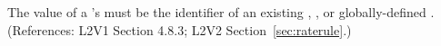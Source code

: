 The value of a \RateRule's  must be the identifier
of an existing \Compartment, \Species, or globally-defined \Parameter.
(References: L2V1 Section 4.8.3; L2V2 Section~\ref{sec:raterule}.)

